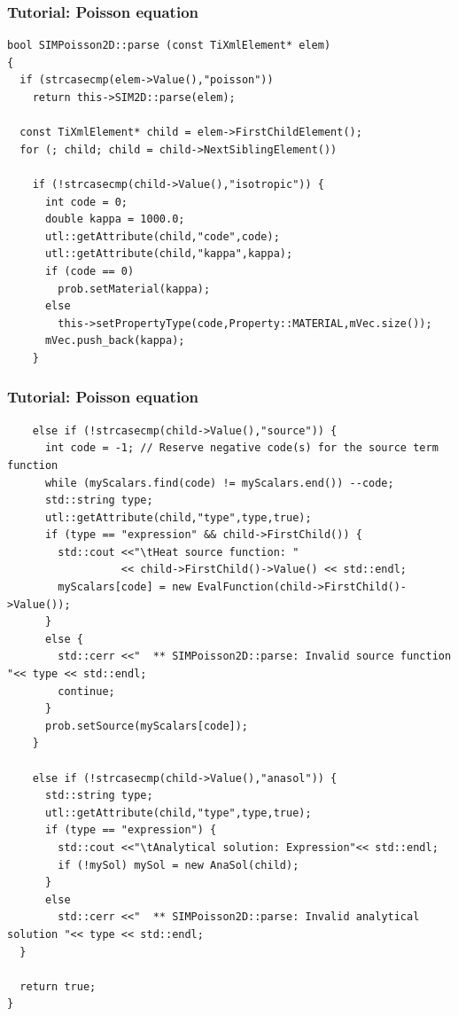 \documentclass{beamer}
\begin{document}
\begin{frame}[fragile] %
 \frametitle{Tutorial: Poisson equation}

 \tiny\begin{verbatim}
bool SIMPoisson2D::parse (const TiXmlElement* elem)
{
  if (strcasecmp(elem->Value(),"poisson"))
    return this->SIM2D::parse(elem);

  const TiXmlElement* child = elem->FirstChildElement();
  for (; child; child = child->NextSiblingElement())

    if (!strcasecmp(child->Value(),"isotropic")) {
      int code = 0;
      double kappa = 1000.0;
      utl::getAttribute(child,"code",code);
      utl::getAttribute(child,"kappa",kappa);
      if (code == 0)
        prob.setMaterial(kappa);
      else
        this->setPropertyType(code,Property::MATERIAL,mVec.size());
      mVec.push_back(kappa);
    }
 \end{verbatim}
\end{frame}
\begin{frame}[fragile] %
 \frametitle{Tutorial: Poisson equation}

 \tiny\begin{verbatim}
    else if (!strcasecmp(child->Value(),"source")) {
      int code = -1; // Reserve negative code(s) for the source term function
      while (myScalars.find(code) != myScalars.end()) --code;
      std::string type;
      utl::getAttribute(child,"type",type,true);
      if (type == "expression" && child->FirstChild()) {
        std::cout <<"\tHeat source function: "
                  << child->FirstChild()->Value() << std::endl;
        myScalars[code] = new EvalFunction(child->FirstChild()->Value());
      }
      else {
        std::cerr <<"  ** SIMPoisson2D::parse: Invalid source function "<< type << std::endl;
        continue;
      }
      prob.setSource(myScalars[code]);
    }

    else if (!strcasecmp(child->Value(),"anasol")) {
      std::string type;
      utl::getAttribute(child,"type",type,true);
      if (type == "expression") {
        std::cout <<"\tAnalytical solution: Expression"<< std::endl;
        if (!mySol) mySol = new AnaSol(child);
      }
      else
        std::cerr <<"  ** SIMPoisson2D::parse: Invalid analytical solution "<< type << std::endl;
  }

  return true;
}
 \end{verbatim}
\end{frame}
\end{document}
